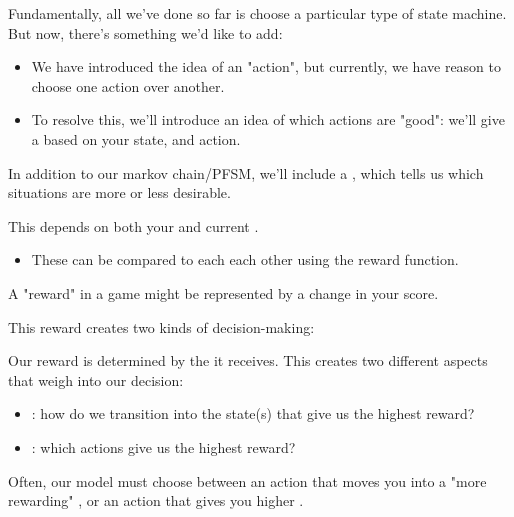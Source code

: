         Fundamentally, all we've done so far is choose a particular type of state machine. But now, there's something we'd like to add:

        \begin{itemize}
            \item We have introduced the idea of an "action", but currently, we have reason to choose one action over another.
            \item To resolve this, we'll introduce an idea of which actions are "good": we'll give a  based on your state, and action.\\
        \end{itemize}

        \begin{concept}
            In addition to our markov chain/PFSM, we'll include a , which tells us which situations are more or less desirable.

            This depends on both your  and current . 
            
            \begin{itemize}
                \item These  can be compared to each each other using the reward function.
            \end{itemize}
        \end{concept}

        \miniex A "reward" in a game might be represented by a change in your score.

        

        This reward creates two kinds of decision-making:\\

        \begin{concept}
            Our reward is determined by the  it receives. This creates two different aspects that weigh into our decision:

            \begin{itemize}
                \item {}: how do we transition into the state(s) that give us the highest reward?
                \item {}: which actions give us the highest reward?
            \end{itemize}

            Often, our model must choose between an action that moves you into a "more rewarding" , or an action that gives you higher .
        \end{concept}

